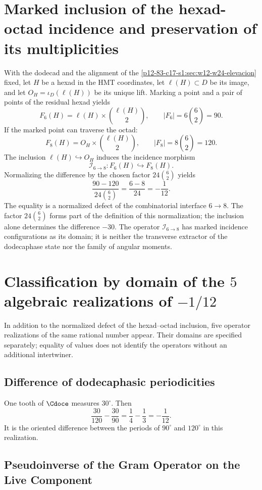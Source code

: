 \section{Marked inclusion of the hexad-octad incidence and preservation of its multiplicities}

With the dodecad and the alignment of the
\cref{p12-83-c17-s1:sec:w12-w24-elevacion} fixed, let \(H\) be a hexad in the HMT coordinates,
let \(\ell(H)\subset D\) be its image, and let
\(O_H=\iota_D(\ell(H))\) be its unique lift. Marking a point
and a pair of points of the residual hexad yields
\[
F_6(H)=\ell(H)\times\binom{\ell(H)}2,
\qquad
|F_6|=6\binom62=90.
\]
If the marked point can traverse the octad:
\[
F_8(H)=O_H\times\binom{\ell(H)}2,
\qquad
|F_8|=8\binom62=120.
\]
The inclusion \(\ell(H)\hookrightarrow O_H\) induces the incidence morphism
\[
 \mathcal I_{6\to8}:F_6(H)\hookrightarrow F_8(H).
\]
Normalizing the difference by the chosen
factor \(24\binom62\) yields
\[
\boxed{
\frac{90-120}{24\binom62}
=\frac{6-8}{24}
=-\frac1{12}.}
\]
The equality is a normalized defect of the combinatorial interface \(6\to8\). The factor \(24\binom62\) forms part of the definition of this normalization; the inclusion alone determines the difference \(-30\). The operator \(\mathcal I_{6\to8}\) has marked incidence configurations as its domain; it is neither the transverse extractor of the dodecaphase state nor the family of angular moments.

\section{Classification by domain of the \(5\) algebraic realizations of \(-1/12\)}

In addition to the normalized defect of the hexad--octad inclusion,
five operator realizations of the same rational number appear. Their domains are
specified separately; equality of values does not identify the
operators without an additional intertwiner.

\subsection{Difference of dodecaphasic periodicities}

One tooth of \(\Cdoce\) measures \(30^\circ\). Then
\[
\frac{30}{120}-\frac{30}{90}
=\frac14-\frac13
=-\frac1{12}.
\]
It is the oriented difference between the periods of \(90^\circ\) and
\(120^\circ\) in this realization.

\subsection{Pseudoinverse of the Gram Operator on the Live Component}

